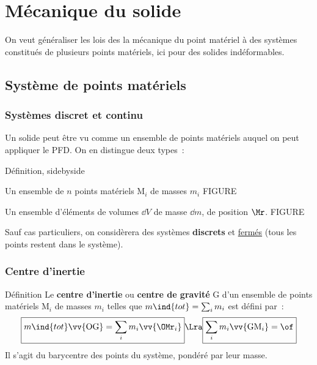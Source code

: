 \documentclass[../main/main.tex]{subfiles}
\begin{document}
\setcounter{chapter}{7}

\chapter{M\'ecanique du solide}
On veut généraliser les lois des la mécanique du point matériel à des systèmes
constitués de plusieurs points matériels, ici pour des solides indéformables.

\section{Système de points matériels}
\subsection{Systèmes discret et continu}
Un solide peut être vu comme un ensemble de points matériels auquel on peut
appliquer le PFD. On en distingue deux types~:
\begin{tdefi}{Définition, sidebyside}
    \begin{center}
    \end{center}
    Un ensemble de $n$ points matériels M$_i$ de masses $m_i$
    FIGURE
    \tcblower
    \begin{center}
    \end{center}
    Un ensemble d'éléments de volumes $\dd{V}$ de masse $\dd{m}$, de position
    $\Mr$.
    FIGURE
\end{tdefi}

Sauf cas particuliers, on considèrera des systèmes \textbf{discrets} et
\ul{fermés} (tous les points restent dans le système).

\subsection{Centre d'inertie}
\begin{tdefi}{Définition}
    Le \textbf{centre d'inertie} ou \textbf{centre de gravité} G d'un ensemble
    de points matériels M$_i$ de masses $m_i$ telles que $m\ind{tot} = \sum_i
    m_i$ est défini par~:
    \[
        \boxed{m\ind{tot}\vv{\rm OG} = \sum_i m_i \vv{{\OMr}_i}}
        \Lra
        \boxed{\sum_i m_i\vv{{\rm GM}_i} = \of}
    \]
    Il s'agit du barycentre des points du système, pondéré par leur masse.
\end{tdefi}
\end{document}
